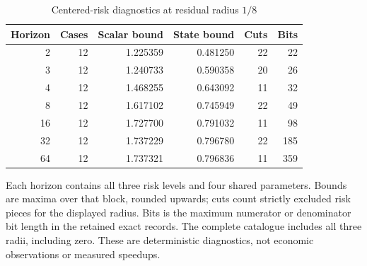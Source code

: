 \begin{table}[htbp]
\centering
\caption{Centered-risk diagnostics at residual radius $1/8$}\label{tab:centered92}
{\small\setlength{\tabcolsep}{4pt}
\begin{tabular}{rrrrrr}
\hline
Horizon & Cases & Scalar bound & State bound & Cuts & Bits \\
\hline
2 & 12 & 1.225359 & 0.481250 & 22 & 22 \\
3 & 12 & 1.240733 & 0.590358 & 20 & 26 \\
4 & 12 & 1.468255 & 0.643092 & 11 & 32 \\
8 & 12 & 1.617102 & 0.745949 & 22 & 49 \\
16 & 12 & 1.727700 & 0.791032 & 11 & 98 \\
32 & 12 & 1.737229 & 0.796780 & 22 & 185 \\
64 & 12 & 1.737321 & 0.796836 & 11 & 359 \\
\hline
\end{tabular}}
\par\smallskip
{\footnotesize Each horizon contains all three risk levels and four shared parameters. Bounds are maxima over that block, rounded upwards; cuts count strictly excluded risk pieces for the displayed radius. Bits is the maximum numerator or denominator bit length in the retained exact records. The complete catalogue includes all three radii, including zero. These are deterministic diagnostics, not economic observations or measured speedups.}
\end{table}
